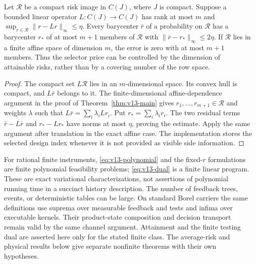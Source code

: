 \begin{proposition}
\label{prop:v13-dimension}
Let $\mathcal R$ be a compact risk image in $C(J)$, where $J$ is compact.
Suppose a bounded linear operator $L:C(J)\to C(J)$ has rank at most $m$
and $\sup_{r\in\mathcal R}\|r-Lr\|_\infty\le\eta$. Every barycenter
$\bar r$ of a probability on $\mathcal R$ has a barycenter $r_*$ of
at most $m+1$ members of $\mathcal R$ with
$\|\bar r-r_*\|_\infty\le2\eta$. If $\mathcal R$ lies in a finite
affine space of dimension $m$, the error is zero with at most $m+1$
members. Thus the selector price can be controlled by the dimension
of attainable risks, rather than by a covering number of the row space.
\end{proposition}
\begin{proof}
The compact set $L\mathcal R$ lies in an $m$-dimensional space. Its
convex hull is compact, and $L\bar r$ belongs to it. The
finite-dimensional affine-dependence argument in the proof of
Theorem~\ref{thm:v13-main} gives $r_1,\ldots,r_{m+1}\in\mathcal R$
and weights $\lambda$ such that
$L\bar r=\sum_i\lambda_iLr_i$. Put $r_*=\sum_i\lambda_ir_i$.
The two residual terms $\bar r-L\bar r$ and $r_*-Lr_*$ have norms
at most $\eta$, proving the estimate. Apply the same argument after
translation in the exact affine case. The implementation stores the
selected design index whenever it is not provided as visible side
information.
\end{proof}

\begin{remark}
For rational finite instruments, \eqref{eq:v13-polynomial} and the
fixed-$r$ formulations are finite polynomial feasibility problems;
\eqref{eq:v13-dual} is a finite linear program. These are exact
variational characterizations, not assertions of polynomial running
time in a succinct history description. The number of feedback trees,
events, or deterministic tables can be large. On standard Borel
carriers the same definitions use suprema over measurable feedback
and tests and infima over executable kernels. Their product-state
composition and decision transport remain valid by the same channel
argument. Attainment and the finite testing dual are asserted here
only for the stated finite class. The average-risk and physical results
below give separate nonfinite theorems with their own hypotheses.
\end{remark}
